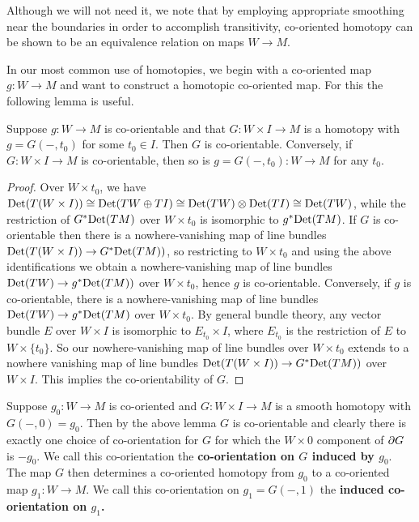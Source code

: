 Although we will not need it, we note that by employing appropriate smoothing near the boundaries in order to accomplish transitivity, co-oriented homotopy can be shown to be an equivalence relation on maps $W \to M$.

In our most common use of homotopies, we begin with a co-oriented map $g \colon W \to M$ and want to construct a homotopic co-oriented map.
For this the following lemma is useful.

\begin{lemma}\label{L: co-orientable homotopies}
	Suppose $g \colon W \to M$ is co-orientable and that $G \colon W \times I \to M$ is a homotopy with $g = G(-,t_0)$ for some $t_0 \in I$.
	Then $G$ is co-orientable.
	Conversely, if $G \colon W \times I \to M$ is co-orientable, then so is $g = G(-,t_0) \colon W \to M$ for any $t_0$.
\end{lemma}

\begin{proof}
	Over $W \times t_0$, we have ${\rm Det}(T(W \times I)) \cong {\rm Det}(TW \oplus TI) \cong {\rm Det}(TW) \otimes {\rm Det} (TI) \cong {\rm Det}(TW)$, while the restriction of $G^*{\rm Det}(TM)$ over $W \times t_0$ is isomorphic to $g^*{\rm Det}(TM)$.
	If $G$ is co-orientable then there is a nowhere-vanishing map of line bundles ${\rm Det}(T(W \times I)) \to G^*{\rm Det}(TM))$, so restricting to $W \times t_0$ and using the above identifications we obtain a nowhere-vanishing map of line bundles ${\rm Det}(TW) \to g^*{\rm Det}(TM))$ over $W \times t_0$, hence $g$ is co-orientable.
	Conversely,
	if $g$ is co-orientable, there is a nowhere-vanishing map of line bundles ${\rm Det}(TW) \to g^*{\rm Det}(TM)$ over $W \times t_0$.
	By general bundle theory, any vector bundle $E$ over $W \times I$ is isomorphic to $E_{t_0} \times I$, where $E_{t_0}$ is the restriction of $E$ to $W \times \{t_0\}$.
	So our nowhere-vanishing map of line bundles over $W \times t_0$ extends to a nowhere vanishing map of line bundles ${\rm Det}(T(W \times I)) \to G^*{\rm Det}(TM))$ over $W \times I$.
	This implies the co-orientability of $G$.
\end{proof}

\begin{definition}\label{D: homotopy co-orientation}
	Suppose $g_0 \colon W \to M$ is co-oriented and $G \colon W \times I \to M$ is a smooth homotopy with $G(-,0) = g_0$.
	Then by the above lemma $G$ is co-orientable and clearly there is exactly one choice of co-orientation for $G$ for which the $W \times 0$ component of $\partial G$ is $-g_0$.
	We call this co-orientation the \textbf{co-orientation on $G$ induced by $g_0$}.
	The map $G$ then determines a co-oriented homotopy from $g_0$ to a co-oriented map $g_1 \colon W \to M$.
	We call this co-orientation on $g_1 = G(-,1)$ the \textbf{induced co-orientation on $g_1$.}
\end{definition}

